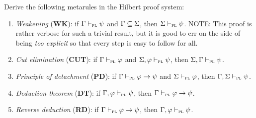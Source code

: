 \documentclass[a4paper, 11pt]{article}                  %
\begin{document}
Derive the following metarules in the Hilbert proof system:

\begin{enumerate}

	\item \textit{Weakening} (\textbf{WK}): if $\Gamma \vdash_{\textsc{pl}} \psi$ and $\Gamma \subseteq \Sigma$, then $\Sigma \vdash_{\textsc{pl}} \psi$.
	      NOTE: This proof is rather verbose for such a trivial result, but it is good to err on the side of being \textit{too explicit} so that every step is easy to follow for all.

	\item \textit{Cut elimination} (\textbf{CUT}): if $\Gamma \vdash_{\textsc{pl}} \varphi$ and $\Sigma, \varphi \vdash_{\textsc{pl}} \psi$, then $\Sigma,\Gamma \vdash_{\textsc{pl}} \psi$.

	\item \textit{Principle of detachment} (\textbf{PD}): if $\Gamma \vdash_{\textsc{pl}} \varphi \rightarrow \psi$ and $\Sigma \vdash_{\textsc{pl}} \varphi$, then $\Gamma, \Sigma \vdash_{\textsc{pl}} \psi$.

	\item \textit{Deduction theorem} (\textbf{DT}): if $\Gamma, \varphi \vdash_{\textsc{pl}} \psi$, then $\Gamma \vdash_{\textsc{pl}} \varphi \rightarrow \psi$.

	\item \textit{Reverse deduction} (\textbf{RD}): if $\Gamma \vdash_{\textsc{pl}} \varphi \rightarrow \psi$, then $\Gamma, \varphi \vdash_{\textsc{pl}} \psi$.

\end{enumerate}
\end{document}
